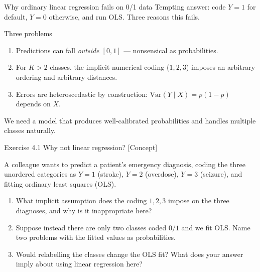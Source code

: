 \documentclass[aspectratio=169,11pt]{beamer}
\begin{document}
\begin{frame}{Why ordinary linear regression fails on 0/1 data}
  Tempting answer: code $Y = 1$ for default, $Y = 0$ otherwise, and
  run OLS. Three reasons this fails.
  \begin{alertblock}{Three problems}
    \begin{enumerate}
      \item Predictions can fall \emph{outside $[0, 1]$} --- nonsensical
            as probabilities.
      \item For $K > 2$ classes, the implicit numerical coding
            ($1, 2, 3$) imposes an arbitrary ordering and arbitrary
            distances.
      \item Errors are heteroscedastic by construction:
            $\mathrm{Var}(Y \mid X) = p(1-p)$ depends on $X$.
    \end{enumerate}
  \end{alertblock}
  We need a model that produces well-calibrated probabilities and
  handles multiple classes naturally.
\end{frame}



\begin{frame}{Exercise 4.1 \textemdash{} Why not linear regression? [Concept]}
\begin{exercise}
A colleague wants to predict a patient's emergency diagnosis, coding the
three unordered categories as $Y=1$ (stroke), $Y=2$ (overdose),
$Y=3$ (seizure), and fitting ordinary least squares (OLS).
\begin{enumerate}
  \item What implicit assumption does the coding $1,2,3$ impose on the
        three diagnoses, and why is it inappropriate here?
  \item Suppose instead there are only two classes coded $0/1$ and we fit
        OLS. Name two problems with the fitted values as probabilities.
  \item Would relabelling the classes change the OLS fit? What does your
        answer imply about using linear regression here?
\end{enumerate}
\end{exercise}
\end{frame}
\end{document}
